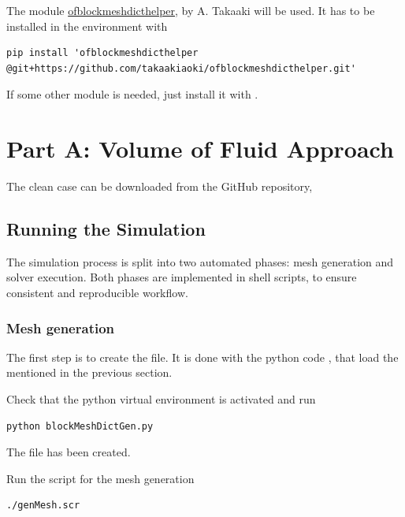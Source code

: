 \documentclass[
    parskip=half,      %
    DIV=12,            %
    headings=normal,   %
    fontsize=11pt,     %
    english            %
]{scrartcl}
\begin{document}
The module 
\href{https://github.com/takaakiaoki/ofblockmeshdicthelper}{ofblockmeshdicthelper}, by 
A. Takaaki will be used. It has to be installed in the environment with

\begin{lstlisting}[style=terminal]
pip install 'ofblockmeshdicthelper @git+https://github.com/takaakiaoki/ofblockmeshdicthelper.git'
\end{lstlisting}

If some other module is needed, just install it with .


\section{Part A: Volume of Fluid Approach} 

The clean case can be downloaded from the GitHub repository,



\subsection{Running the Simulation}

The simulation process is split into two automated phases: mesh generation and solver
execution. Both phases are implemented in shell scripts, to ensure consistent
and reproducible workflow.

\subsubsection{Mesh generation}

The first step is to create the  file. It is
done with the python code , that load the 
 mentioned in the previous section.


Check that the python virtual environment is activated and run
\begin{lstlisting}[style=terminal]
python blockMeshDictGen.py
\end{lstlisting}
The file  has been created.

Run the script for the mesh generation

\begin{lstlisting}[style=terminal]
./genMesh.scr
\end{lstlisting}
\end{document}
